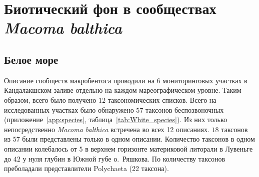 		\section{Биотический фон в сообществах {\it Macoma balthica}}

	\subsection{Белое море}
Описание сообществ макробентоса проводили на 6 мониторинговых участках в Кандалакшском заливе отдельно на каждом мареографическом уровне. 
Таким образом, всего было получено $12$ таксономических списков.
Всего на  исследованных участках было обнаружено $57$ таксонов беспозвоночных (приложение~\ref{app:species}, таблица~\ref{tab:White_species}).
Из них только непосредственно {\it Macoma balthica} встречена во всех 12 описаниях.
$18$ таксонов из $57$ были представлены только в одном описании.
Количество таксонов в одном описании колебалось от $5$ в верхнем горизонте материковой литорали в Лувеньге до $42$ у нуля глубин в Южной губе о.~Ряшкова.
По количеству таксонов преболадали представлители Polychaeta (22 таксона).


